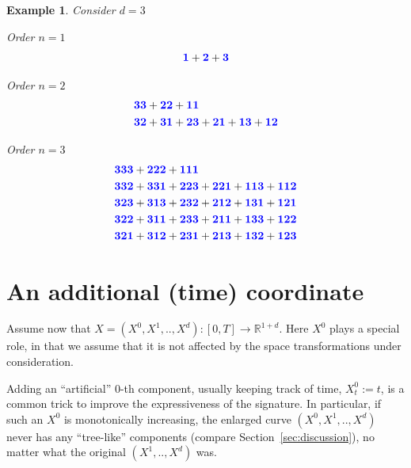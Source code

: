 \documentclass{scrartcl}
\theoremstyle{plain}
\newtheorem{example}[theorem]{Example}
\newtheorem{lemma}[theorem]{Lemma}
\theoremstyle{definition}
\newcommand{\R}{\mathbb{R}}
\newcommand{\1}[1]{1_{\{#1\}}}
\newcommand{\ds}{d} %
\def\word#1{{\color{blue}\mathbf{#1}}}
\begin{document}
\begin{example}
  \label{ex:permInvariants}
  Consider $\ds=3$

  Order $n=1$
  \begin{align*}
    \word{1} + \word{2} + \word{3}
  \end{align*}

  Order $n=2$
  \begin{align*}
    &\word{33} + \word{22} + \word{11}  \\
    &\word{32} + \word{31} + \word{23} + \word{21} + \word{13} + \word{12}
  \end{align*}

  Order $n=3$
  \begin{align*}
    &\word{333} + \word{222} + \word{111} \\
    &\word{332} + \word{331} + \word{223} + \word{221} + \word{113} + \word{112} \\
    &\word{323} + \word{313} + \word{232} + \word{212} + \word{131} + \word{121} \\
    &\word{322} + \word{311} + \word{233} + \word{211} + \word{133} + \word{122} \\
    &\word{321} + \word{312} + \word{231} + \word{213} + \word{132} + \word{123}
  \end{align*}
\end{example}


%
%

\section{An additional (time) coordinate}
\label{sec:time}

Assume now that $X = (X^0,X^1,..,X^\ds): [0,T] \to \R^{1+\ds}$.
Here $X^0$ plays a special role, in that we assume that it is not affected by the space transformations under consideration.

Adding an ``artificial'' $0$-th component, usually keeping track of time, $X^0_t := t$,
is a common trick to improve the expressiveness of the signature.
In particular, if such an $X^0$ is monotonically increasing, the enlarged curve $(X^0,X^1,..,X^\ds)$
never has any ``tree-like'' components (compare Section~\ref{sec:discussion}),
no matter what the original $(X^1,..,X^\ds)$ was.
\end{document}
